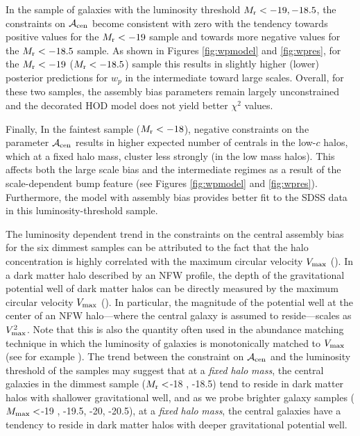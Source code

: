 In the sample of galaxies with the luminosity threshold $M_{\rm r} < -19, -18.5$, the constraints on $\mathcal{A}_{\rm cen}$ become consistent with zero with the tendency towards positive values for the $M_{\rm r}<-19$ sample and towards more negative values for the $M_{\rm r }<-18.5$ sample. As shown in Figures \ref{fig:wpmodel} and \ref{fig:wpres}, for the $M_{\rm r}<-19$ ($M_{\rm r}<-18.5$) sample this results in slightly higher (lower) posterior predictions for $w_{p}$ in the intermediate toward large scales. Overall, for these two samples, the assembly bias parameters remain largely unconstrained and the decorated HOD model does not yield better $\chi^{2}$ values. 

Finally, In the faintest sample ($M_{\rm r} < -18$), negative constraints on the parameter $\mathcal{A}_{\rm cen}$ results in higher expected number of centrals in the low-$c$ halos, which at a fixed halo mass, cluster less strongly (in the low mass halos). This affects both the large scale bias and the intermediate regimes as a result of the scale-dependent bump feature (see Figures \ref{fig:wpmodel} and \ref{fig:wpres}). Furthermore, the model with assembly bias provides better fit to the SDSS data in this luminosity-threshold sample. 

The luminosity dependent trend in the constraints on the central assembly bias for the six dimmest samples can be attributed to the fact that the halo concentration is highly correlated with the maximum circular velocity $V_{\rm max}$ (\citealt{prada2012}). In a dark matter halo described by an NFW profile, the depth of the gravitational potential well of dark matter halos can be directly measured by the maximum circular velocity $V_{\rm max}$ (\citealt{vmax_potential}). In particular, the magnitude of the potential well at the center of an NFW halo---where the central galaxy is assumed to reside---scales as $V_{\rm max}^{2}$. Note that this is also the quantity often used in the abundance matching technique in which the luminosity of galaxies is monotonically matched to $V_{\rm max}$ (see for example \citealt{reddick2013, hod_vs_sham, halodemographic}). The trend between the constraint on $\mathcal{A}_{\rm cen}$ and the luminosity threshold of the samples may suggest that at a \emph{fixed} \emph{halo} \emph{mass}, the central galaxies in the dimmest sample ($M_{\rm r}<$-18 , -18.5) tend to reside in dark matter halos with shallower gravitational well, and as we probe brighter galaxy samples ($M_{\rm max}<$-19 , -19.5, -20, -20.5), at a \emph{fixed} \emph{halo} \emph{mass}, the central galaxies have a tendency to reside in dark matter halos with deeper gravitational potential well. 

